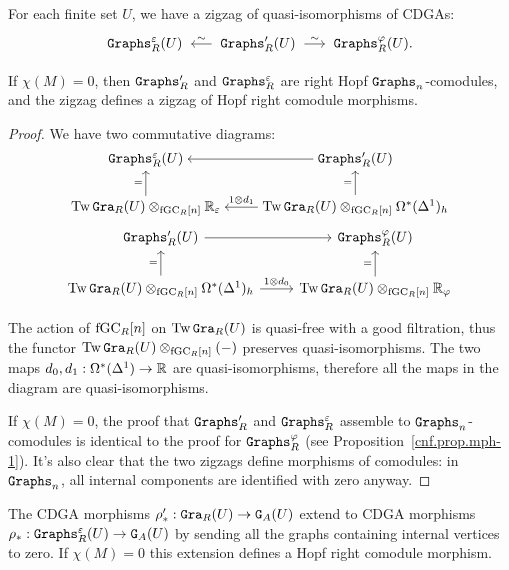 \begin{proposition}
  \label{cnf.prop.zig-gra-e-phi}
  For each finite set $U$, we have a zigzag of quasi-isomorphisms of CDGAs:
  \[ \Graphs^{\varepsilon}_{R}(U) \qiso* \Graphs'_{R}(U) \qiso \Graphs^{\varphi}_{R}(U). \]

  If $\chi(M) = 0$, then $\mathtt{Graphs}'_{R}$ and $\mathtt{Graphs}^{\varepsilon}_{R}$ are right Hopf $\mathtt{Graphs}_{n}$-comodules, and the zigzag defines a zigzag of Hopf right comodule morphisms.
\end{proposition}

\begin{proof}
  We have two commutative diagrams:
  \[ \begin{tikzcd}[cramped]
      \Graphs^{\varepsilon}_{R}(U) & \Graphs'_{R}(U) \lar{} \\
      \Tw\Gra_{R}(U) \otimes_{\fGC_{R}[n]} \R_{\varepsilon} \uar{=}
      & \Tw\Gra_{R}(U) \otimes_{\fGC_{R}[n]} \Omega^{*}(\Delta^{1})_{h} \uar{=} \lar[swap]{1 \otimes d_{1}}
    \end{tikzcd} \]
\[ \begin{tikzcd}
    \Graphs'_{R}(U) \rar{} & \Graphs^{\varphi}_{R}(U) \\
    \Tw\Gra_{R}(U) \otimes_{\fGC_{R}[n]} \Omega^{*}(\Delta^{1})_{h} \uar{=} \rar{1 \otimes d_{0}}
      & \Tw\Gra_{R}(U) \otimes_{\fGC_{R}[n]} \R_{\varphi} \uar{=}
  \end{tikzcd} \]

  The action of $\mathrm{fGC}_{R}[n]$ on $\operatorname{Tw}\mathtt{Gra}_{R}(U)$ is quasi-free with a good filtration, thus the functor $\operatorname{Tw} \mathtt{Gra}_{R}(U) \otimes_{\mathrm{fGC}_{R}[n]} (-)$ preserves quasi-isomorphisms.
  The two maps $d_{0}, d_{1} : \Omega^{*}(\Delta^{1}) \to \mathbb{R}$ are quasi-isomorphisms, therefore all the maps in the diagram are quasi-isomorphisms.

  If $\chi(M) = 0$, the proof that $\mathtt{Graphs}'_{R}$ and $\mathtt{Graphs}^{\varepsilon}_{R}$ assemble to $\mathtt{Graphs}_{n}$-co\-mo\-dules is identical to the proof for $\mathtt{Graphs}^{\varphi}_{R}$ (see Proposition~\ref{cnf.prop.mph-1}).
  It's also clear that the two zigzags define morphisms of comodules: in $\mathtt{Graphs}_{n}$, all internal components are identified with zero anyway.
\end{proof}

\begin{proposition}
  \label{cnf.prop.mph-2}
  The CDGA morphisms $\rho'_{*} : \mathtt{Gra}_{R}(U) \to \mathtt{G}_{A}(U)$ extend to CDGA morphisms $\rho_{*} : \mathtt{Graphs}^{\varepsilon}_{R}(U) \to \mathtt{G}_{A}(U)$ by sending all the graphs containing internal vertices to zero.
  If $\chi(M) = 0$ this extension defines a Hopf right comodule morphism.
\end{proposition}

